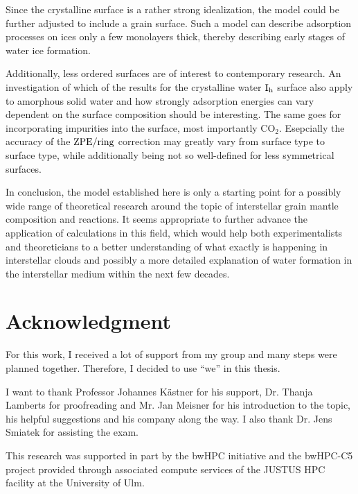 Since the crystalline surface is a rather strong idealization, the model could
be further adjusted to include a grain surface. Such a model can describe
adsorption processes on ices only a few monolayers thick, thereby describing
early stages of water ice formation.

Additionally, less ordered surfaces are of interest to contemporary research. An
investigation of which of the results for the crystalline water $\text I_\text h$ surface
also apply to amorphous solid water and how strongly adsorption energies can
vary dependent on the surface composition should be interesting. The same goes
for incorporating impurities into the surface, most importantly CO$_2$.
Esepcially the accuracy of the $\text{ZPE}/\text{ring}$ correction may greatly vary from surface type to
surface type, while additionally being not so well-defined for less symmetrical
surfaces.

In conclusion, the model established here is only a starting point for a
possibly wide range of theoretical research around the topic of interstellar
grain mantle composition and reactions. It seems appropriate to further advance
the application of  calculations in this field, which would help
both experimentalists and theoreticians to a better understanding of what
exactly is happening in interstellar clouds and possibly a more detailed
explanation of water formation in the interstellar medium within the next few
decades.

\section*{Acknowledgment}
For this work, I received a lot of support from my group and many steps were
planned together. Therefore, I decided to use ``we'' in this thesis.

I want to thank Professor Johannes Kästner for his support, Dr. Thanja Lamberts
for proofreading and Mr. Jan Meisner for his introduction to the topic, his
helpful suggestions and his company along the way. I also thank Dr. Jens
Smiatek for assisting the exam.

This research was supported in part by the bwHPC initiative and the bwHPC-C5
project\cite{JUSTUS} provided through associated compute services of the JUSTUS
HPC facility at the University of Ulm.
% 

%
%

%
{}
